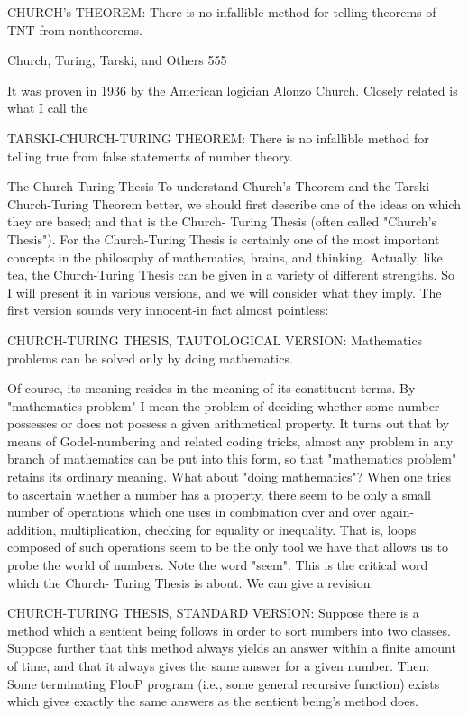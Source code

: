 {CHURCH's THEOREM: There is no infallible method for telling theorems of TNT from
nontheorems.


Church, Turing, Tarski, and Others                                                     555

It was proven in 1936 by the American logician Alonzo Church. Closely related is what I
call the

TARSKI-CHURCH-TURING THEOREM: There is no infallible method for telling true
from false statements of number theory.

                             The Church-Turing Thesis
To understand Church's Theorem and the Tarski-Church-Turing Theorem better, we
should first describe one of the ideas on which they are based; and that is the Church-
Turing Thesis (often called "Church's Thesis"). For the Church-Turing Thesis is certainly
one of the most important concepts in the philosophy of mathematics, brains, and
thinking.
        Actually, like tea, the Church-Turing Thesis can be given in a variety of different
strengths. So I will present it in various versions, and we will consider what they imply.
The first version sounds very innocent-in fact almost pointless:

       CHURCH-TURING THESIS, TAUTOLOGICAL VERSION: Mathematics
       problems can be solved only by doing mathematics.

Of course, its meaning resides in the meaning of its constituent terms. By "mathematics
problem" I mean the problem of deciding whether some number possesses or does not
possess a given arithmetical property. It turns out that by means of Godel-numbering and
related coding tricks, almost any problem in any branch of mathematics can be put into
this form, so that "mathematics problem" retains its ordinary meaning. What about "doing
mathematics"? When one tries to ascertain whether a number has a property, there seem
to be only a small number of operations which one uses in combination over and over
again-addition, multiplication, checking for equality or inequality. That is, loops
composed of such operations seem to be the only tool we have that allows us to probe the
world of numbers. Note the word "seem". This is the critical word which the Church-
Turing Thesis is about. We can give a revision:

   CHURCH-TURING THESIS, STANDARD VERSION: Suppose there is a
    method which a sentient being follows in order to sort numbers into two classes.
    Suppose further that this method always yields an answer within a finite amount
    of time, and that it always gives the same answer for a given number. Then:
    Some terminating FlooP program (i.e., some general recursive function) exists
    which gives exactly the same answers as the sentient being's method does.

}
